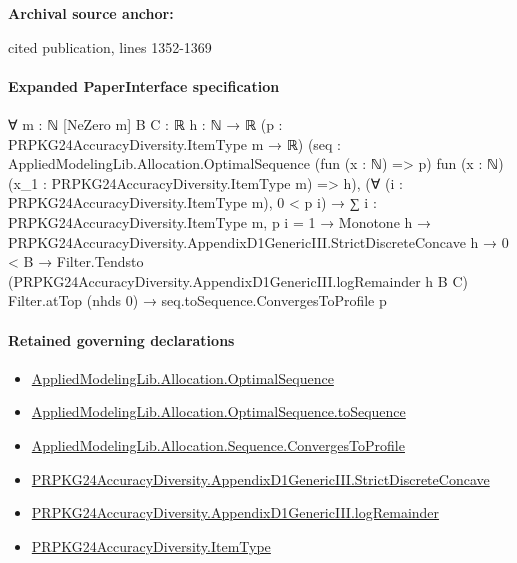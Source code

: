 \documentclass[10pt]{article}
\begin{document}
\textbf{Archival source anchor:} {\footnotesize\raggedright cited publication, lines 1352-\allowbreak{}1369\par}
\paragraph{Expanded PaperInterface specification}
\begin{ReviewVerbatim}
∀ {m : ℕ} [NeZero m] {B C : ℝ} {h : ℕ → ℝ} (p : PRPKG24AccuracyDiversity.ItemType m → ℝ)
  (seq :
    AppliedModelingLib.Allocation.OptimalSequence (fun (x : ℕ) => p)
      fun (x : ℕ) (x_1 : PRPKG24AccuracyDiversity.ItemType m) => h),
  (∀ (i : PRPKG24AccuracyDiversity.ItemType m), 0 < p i) →
    ∑ i : PRPKG24AccuracyDiversity.ItemType m, p i = 1 →
      Monotone h →
        PRPKG24AccuracyDiversity.AppendixD1GenericIII.StrictDiscreteConcave h →
          0 < B →
            Filter.Tendsto (PRPKG24AccuracyDiversity.AppendixD1GenericIII.logRemainder h B C) Filter.atTop (nhds 0) →
              seq.toSequence.ConvergesToProfile p
\end{ReviewVerbatim}

\paragraph{Retained governing declarations}
\begin{itemize}\raggedright
\item \hyperlink{governing-declaration-de3def91e8620291}{Applied\allowbreak{}Modeling\allowbreak{}Lib.\allowbreak{}Allocation.\allowbreak{}Optimal\allowbreak{}Sequence}
\item \hyperlink{governing-declaration-7a4a864147660f7c}{Applied\allowbreak{}Modeling\allowbreak{}Lib.\allowbreak{}Allocation.\allowbreak{}Optimal\allowbreak{}Sequence.\allowbreak{}to\allowbreak{}Sequence}
\item \hyperlink{governing-declaration-ec09422b2ba8f633}{Applied\allowbreak{}Modeling\allowbreak{}Lib.\allowbreak{}Allocation.\allowbreak{}Sequence.\allowbreak{}Converges\allowbreak{}To\allowbreak{}Profile}
\item \hyperlink{governing-declaration-b20b00fc9fc5ce10}{PRPKG24\allowbreak{}Accuracy\allowbreak{}Diversity.\allowbreak{}Appendix\allowbreak{}D1\allowbreak{}Generic\allowbreak{}III.\allowbreak{}Strict\allowbreak{}Discrete\allowbreak{}Concave}
\item \hyperlink{governing-declaration-b9eab9388a840b71}{PRPKG24\allowbreak{}Accuracy\allowbreak{}Diversity.\allowbreak{}Appendix\allowbreak{}D1\allowbreak{}Generic\allowbreak{}III.\allowbreak{}log\allowbreak{}Remainder}
\item \hyperlink{governing-declaration-562ef32e180a12be}{PRPKG24\allowbreak{}Accuracy\allowbreak{}Diversity.\allowbreak{}Item\allowbreak{}Type}
\end{itemize}
\end{document}
